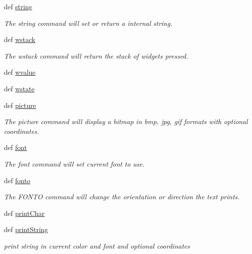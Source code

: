 \begin{DoxyCompactItemize}
def \hyperlink{group___widgets_ga606e61e5ba0ea6ae6ada021e7c021b39}{string}
\begin{DoxyCompactList}\small\item\em The string command will set or return a internal string. \end{DoxyCompactList}\item 
def \hyperlink{group___widgets_ga70b40969e280a9c315b84c18848309ca}{wstack}
\begin{DoxyCompactList}\small\item\em The wstack command will return the stack of widgets pressed. \end{DoxyCompactList}\item 
def \hyperlink{group___widgets_ga7eaa2fac8abbadf04fa9afb49702906a}{wvalue}
\item 
def \hyperlink{group___widgets_gaada0b335d54904b4f4517755ace97e47}{wstate}
\item 
def \hyperlink{group___bitmap_font_ga3bdde0a3f8505adbfb3c4b7107da7650}{picture}
\begin{DoxyCompactList}\small\item\em The picture command will display a bitmap in bmp, jpg, gif formats with optional coordinates. \end{DoxyCompactList}\item 
def \hyperlink{group___bitmap_font_ga7099c8ffc9b76ad3213d241bb8b8070f}{font}
\begin{DoxyCompactList}\small\item\em The font command will set current font to use. \end{DoxyCompactList}\item 
def \hyperlink{group___bitmap_font_ga445e7a916dbdae456f88bea5fcd88745}{fonto}
\begin{DoxyCompactList}\small\item\em The F\-O\-N\-T\-O command will change the orientation or direction the text prints. \end{DoxyCompactList}\item 
def \hyperlink{group___bitmap_font_gafe8f092541df1ab4d72798e5f3b4e66d}{print\-Char}
\item 
def \hyperlink{group___bitmap_font_gac3a90d479a0423de66988b9850f4852c}{print\-String}
\begin{DoxyCompactList}\small\item\em print string in current color and font and optional coordinates \end{DoxyCompactList}\end{DoxyCompactItemize}
